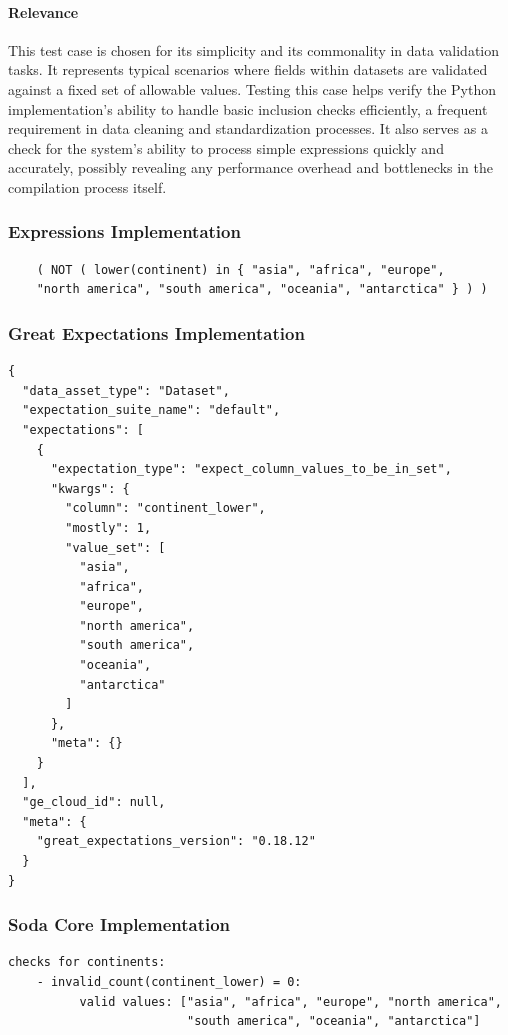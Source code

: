\paragraph{Relevance} This test case is chosen for its simplicity and its commonality in data validation tasks. It represents typical scenarios where fields within datasets are validated against a fixed set of allowable values. Testing this case helps verify the Python implementation’s ability to handle basic inclusion checks efficiently, a frequent requirement in data cleaning and standardization processes. It also serves as a check for the system’s ability to process simple expressions quickly and accurately, possibly revealing any performance overhead and bottlenecks in the compilation process itself.

\subsubsection{Expressions Implementation}

\begin{verbatim}
    ( NOT ( lower(continent) in { "asia", "africa", "europe", 
    "north america", "south america", "oceania", "antarctica" } ) )
\end{verbatim}

\subsubsection{Great Expectations Implementation}

\begin{verbatim}
{
  "data_asset_type": "Dataset",
  "expectation_suite_name": "default",
  "expectations": [
    {
      "expectation_type": "expect_column_values_to_be_in_set",
      "kwargs": {
        "column": "continent_lower",
        "mostly": 1,
        "value_set": [
          "asia",
          "africa",
          "europe",
          "north america",
          "south america",
          "oceania",
          "antarctica"
        ]
      },
      "meta": {}
    }
  ],
  "ge_cloud_id": null,
  "meta": {
    "great_expectations_version": "0.18.12"
  }
}
\end{verbatim}

\subsubsection{Soda Core Implementation}

\begin{verbatim}
checks for continents:
    - invalid_count(continent_lower) = 0:
          valid values: ["asia", "africa", "europe", "north america", 
                         "south america", "oceania", "antarctica"]
\end{verbatim}


